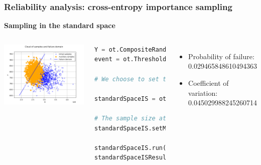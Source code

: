 \documentclass[aspectratio=169]{beamer}
\begin{document}
\begin{frame}[containsverbatim]
\frametitle{Reliability analysis: cross-entropy importance sampling}

\textbf{Sampling in the standard space}

\begin{columns}

    \includegraphics[width=1.\textwidth]{figures/CE_IS.png}

    


\tiny 
\begin{lstlisting}[language=Python, numbers = none]
Y = ot.CompositeRandomVector(g, X)
event = ot.ThresholdEvent(Y, ot.Less(), 0.0)

# We choose to set the intermediate quantile level to 0.35.

standardSpaceIS = otexp.StandardSpaceCrossEntropyImportanceSampling(event, 0.35)

# The sample size at each iteration can be changed
standardSpaceIS.setMaximumOuterSampling(1000)

standardSpaceIS.run()
standardSpaceISResult = standardSpaceIS.getResult()

\end{lstlisting}

\small
\begin{itemize}
\item Probability of failure: 0.029465848610494363
\item Coefficient of variation: 0.045029988245260714
\end{itemize}

	
\end{columns}
\end{frame}
\end{document}

